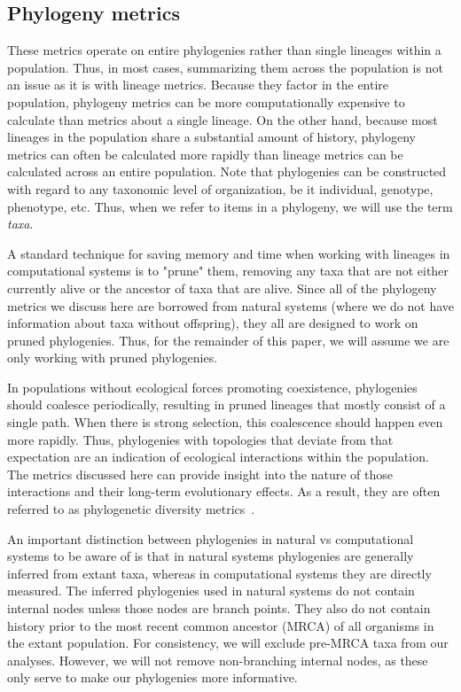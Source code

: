\documentclass[letterpaper]{article}
\begin{document}
\subsection{Phylogeny metrics}

These metrics operate on entire phylogenies rather than single lineages within a population. Thus, in most cases, summarizing them across the population is not an issue as it is with lineage metrics. Because they factor in the entire population, phylogeny metrics can be more computationally expensive to calculate than metrics about a single lineage. On the other hand, because most lineages in the population share a substantial amount of history, phylogeny metrics can often be calculated more rapidly than lineage metrics can be calculated across an entire population. Note that phylogenies can be constructed with regard to any taxonomic level of organization, be it individual, genotype, phenotype, etc. Thus, when we refer to items in a phylogeny, we will use the term \textit{taxa}.

A standard technique for saving memory and time when working with lineages in computational systems is to "prune" them, removing any taxa that are not either currently alive or the ancestor of taxa that are alive. Since all of the phylogeny metrics we discuss here are borrowed from natural systems (where we do not have information about taxa without offspring), they all are designed to work on pruned phylogenies. Thus, for the remainder of this paper, we will assume we are only working with pruned phylogenies.

In populations without ecological forces promoting coexistence, phylogenies should coalesce periodically, resulting in pruned lineages that mostly consist of a single path. When there is strong selection, this coalescence should happen even more rapidly. Thus, phylogenies with topologies that deviate from that expectation are an indication of ecological interactions within the population. The metrics discussed here can provide insight into the nature of those interactions and their long-term evolutionary effects. As a result, they are often referred to as phylogenetic diversity metrics~\citep{tucker_guide_2017}.

An important distinction between phylogenies in natural vs computational systems to be aware of is that in natural systems phylogenies are generally inferred from extant taxa, whereas in computational systems they are directly measured. The inferred phylogenies used in natural systems do not contain internal nodes unless those nodes are branch points. They also do not contain history prior to the most recent common ancestor (MRCA) of all organisms in the extant population. For consistency, we will exclude pre-MRCA taxa from our analyses. However, we will not remove non-branching internal nodes, as these only serve to make our phylogenies more informative.
\end{document}
